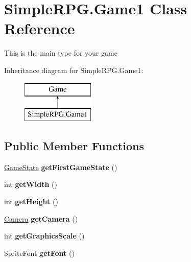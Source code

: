 \hypertarget{class_simple_r_p_g_1_1_game1}{\section{Simple\-R\-P\-G.\-Game1 Class Reference}
\label{class_simple_r_p_g_1_1_game1}
}


This is the main type for your game  


Inheritance diagram for Simple\-R\-P\-G.\-Game1\-:\begin{figure}[H]
\begin{center}
\leavevmode
\includegraphics[height=2.000000cm]{class_simple_r_p_g_1_1_game1}
\end{center}
\end{figure}
\subsection*{Public Member Functions}
\begin{DoxyCompactItemize}
\item 
\hypertarget{class_simple_r_p_g_1_1_game1_aa58c4de2751f3b18058353f9e027eaf1}{\hyperlink{class_simple_r_p_g_1_1_states_1_1_game_state}{Game\-State} {\bfseries get\-First\-Game\-State} ()}\label{class_simple_r_p_g_1_1_game1_aa58c4de2751f3b18058353f9e027eaf1}

\item 
\hypertarget{class_simple_r_p_g_1_1_game1_acc5c4e36f80f0306fdafa3abb5846965}{int {\bfseries get\-Width} ()}\label{class_simple_r_p_g_1_1_game1_acc5c4e36f80f0306fdafa3abb5846965}

\item 
\hypertarget{class_simple_r_p_g_1_1_game1_acbd455c6801cd38476a757d40868d254}{int {\bfseries get\-Height} ()}\label{class_simple_r_p_g_1_1_game1_acbd455c6801cd38476a757d40868d254}

\item 
\hypertarget{class_simple_r_p_g_1_1_game1_a43306d1ac0dbb1e718127ece2b1e8c9e}{\hyperlink{class_simple_r_p_g_1_1_camera}{Camera} {\bfseries get\-Camera} ()}\label{class_simple_r_p_g_1_1_game1_a43306d1ac0dbb1e718127ece2b1e8c9e}

\item 
\hypertarget{class_simple_r_p_g_1_1_game1_a37252745c74499e7d63394079e7005a1}{int {\bfseries get\-Graphics\-Scale} ()}\label{class_simple_r_p_g_1_1_game1_a37252745c74499e7d63394079e7005a1}

\item 
\hypertarget{class_simple_r_p_g_1_1_game1_aabe60775a0239351456d6fd55eb1c838}{Sprite\-Font {\bfseries get\-Font} ()}\label{class_simple_r_p_g_1_1_game1_aabe60775a0239351456d6fd55eb1c838}

\end{DoxyCompactItemize}
